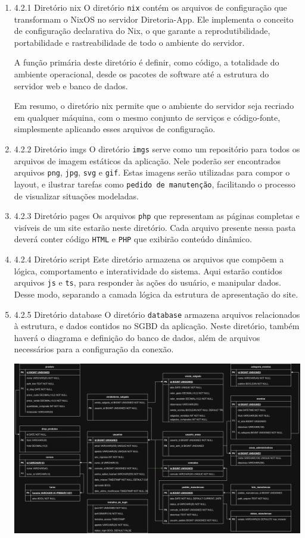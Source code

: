\documentclass[11pt]{article}
\begin{document}
\begin{enumerate}
\item 4.2.1 Diretório nix
\label{sec:org81c3ef4}
O diretório \texttt{nix} contém os arquivos de configuração que transformam o NixOS no servidor Diretoria-App. Ele implementa o conceito de configuração declarativa do Nix, o que garante a reprodutibilidade, portabilidade e rastreabilidade de todo o ambiente do servidor.

A função primária deste diretório é definir, como código, a totalidade do ambiente operacional, desde os pacotes de software até a estrutura do servidor web e banco de dados.

Em resumo, o diretório nix permite que o ambiente do servidor seja recriado em qualquer máquina, com o mesmo conjunto de serviços e código-fonte, simplesmente aplicando esses arquivos de configuração.
\item 4.2.2 Diretório imgs
\label{sec:org23c9bad}
O diretório \texttt{imgs} serve como um repositório para todos os arquivos de imagem estáticos da aplicação. Nele poderão ser encontrados arquivos \texttt{png}, \texttt{jpg}, \texttt{svg} e \texttt{gif}. Estas imagens serão utilizadas para compor o layout, e ilustrar tarefas como \texttt{pedido de manutenção}, facilitando o processo de visualizar situações modeladas.
\item 4.2.3 Diretório pages
\label{sec:org7e0fcf9}
Os arquivos \texttt{php} que representam as páginas completas e visíveis de um site estarão neste diretório. Cada arquivo presente nessa pasta deverá conter código \texttt{HTML} e \texttt{PHP} que exibirão conteúdo dinâmico.
\item 4.2.4 Diretório script
\label{sec:org01b8adc}
Este diretório armazena os arquivos que compõem a lógica, comportamento e interatividade do sistema. Aqui estarão contidos arquivos \texttt{js} e \texttt{ts}, para responder às ações do usuário, e manipular dados. Desse modo, separando a camada lógica da estrutura de apresentação do site.
\item 4.2.5 Diretório database
\label{sec:org6c1b292}
O diretório \texttt{database} armazena arquivos relacionados à estrutura, e dados contidos no SGBD da aplicação. Neste diretório, também haverá o diagrama e definição do banco de dados, além de arquivos necessários para a configuração da conexão.
\begin{center}
\includegraphics[width=.9\linewidth]{./imgs/Diagrama.png}

\end{center}
\end{enumerate}
\end{document}

